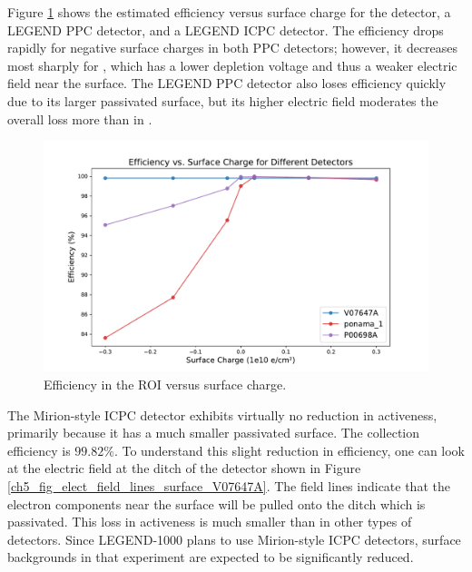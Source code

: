 Figure \ref{fig:efficiency_sc_plot} shows the estimated efficiency versus surface charge for the {\ponama} detector, a LEGEND PPC detector, and a LEGEND ICPC detector. The efficiency drops rapidly for negative surface charges in both PPC detectors; however, it decreases most sharply for {\ponama}, which has a lower depletion voltage and thus a weaker electric field near the surface. The LEGEND PPC detector also loses efficiency quickly due to its larger passivated surface, but its higher electric field moderates the overall loss more than in {\ponama}.

\begin{figure}%
\includegraphics[trim={1.6cm 0.3cm 2cm 1.8cm},clip,width=\linewidth]{ch5/figs/efficiency_0nbb.pdf}
\caption{Efficiency in the ROI versus surface charge.}
\label{fig:efficiency_sc_plot}
\end{figure}

The Mirion-style ICPC detector exhibits virtually no reduction in activeness, primarily because it has a much smaller passivated surface. The collection efficiency is $99.82\%$. To understand this slight reduction in efficiency, one can look at the electric field at the ditch of the detector shown in Figure \ref{ch5_fig_elect_field_lines_surface_V07647A}. The field lines indicate that the electron components near the surface will be pulled onto the ditch which is passivated. This loss in activeness is much smaller than in other types of detectors. Since LEGEND-1000 plans to use Mirion-style ICPC detectors, surface backgrounds in that experiment are expected to be significantly reduced.


